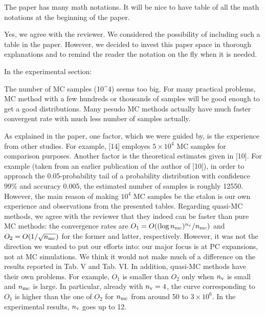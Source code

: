 \begin{reviewer}
The paper has many math notations. It will be nice to have table of all the math notations at the beginning of  the paper.
\end{reviewer}
\begin{authors}
Yes, we agree with the reviewer.
We considered the possibility of including such a table in the paper.
However, we decided to invest this paper space in thorough explanations and to remind the reader the notation on the fly when it is needed.
\end{authors}

\begin{reviewer}
In the experimental section:

The number of MC samples (10\^{}4) seems too big. For many practical problems, MC method with a few hundreds or thousands of samples will be good enough to get a good distributions. Many pesudo MC methods actually have much faster convergent rate with much less number of samples actually.
\end{reviewer}
\begin{authors}
As explained in the paper, one factor, which we were guided by, is the experience from other studies.
For example, [14] employes $5 \times 10^4$ MC samples for comparison purposes.
Another factor is the theoretical estimates given in [10].
For example (taken from an earlier publication of the author of [10]), in order to approach the 0.05-probability tail of a probability distribution with confidence 99\% and accuracy 0.005, the estimated number of samples is roughly 12550.
However, the main reason of making $10^4$ MC samples be the etalon is our own experience and observations from the presented tables.
Regarding quasi-MC methods, we agree with the reviewer that they indeed can be faster than pure MC methods: the convergence rates are $O_1 = O((\log{n_\text{mc}})^{n_\text{v}} / {n_\text{mc}})$ and $O_2 = O(1 / \sqrt{{n_\text{mc}}})$ for the former and latter, respectively.
However, it was not the direction we wanted to put our efforts into: our major focus is at PC expansions, not at MC simulations.
We think it would not make much of a difference on the results reported in Tab. V and Tab. VI.
In addition, quasi-MC methods have their own problems.
For example, $O_1$ is smaller than $O_2$ only when ${n_\text{v}}$ is small and ${n_\text{mc}}$ is large.
In particular, already with ${n_\text{v}} = 4$, the curve corresponding to $O_1$ is higher than the one of $O_2$ for ${n_\text{mc}}$ from around 50 to $3 \times 10^6$.
In the experimental results, ${n_\text{v}}$ goes up to 12.
\end{authors}

